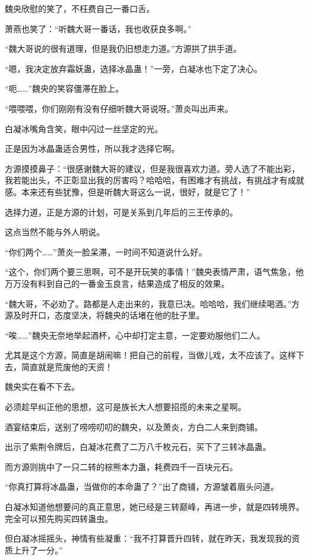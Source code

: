 \begin{this_body}
魏央欣慰的笑了，不枉费自己一番口舌。

萧燕也笑了：“听魏大哥一番话，我也收获良多啊。”

“魏大哥说的很有道理，但是我仍旧想走力道。”方源拱了拱手道。

“嗯，我决定放弃霜妖蛊，选择冰晶蛊！”一旁，白凝冰也下定了决心。

“呃……”魏央的笑容僵滞在脸上。

“喂喂喂，你们刚刚有没有仔细听魏大哥说呀。”萧炎叫出声来。

白凝冰嘴角含笑，眼中闪过一丝坚定的光。

正是因为冰晶蛊适合男性，所以我才选择它啊。

方源摸摸鼻子：“很感谢魏大哥的建议，但是我很喜欢力道。旁人选了不能出彩，我若能出头，不正彰显出我的厉害吗？哈哈哈，有困难才有挑战，有挑战才有成就感。本来还有些犹豫，但是听魏大哥这么一说，很好，就是它了！”

选择力道，正是方源的计划，可是关系到几年后的三王传承的。

这点当然不能与外人明说。

“你们两个……”萧炎一脸呆滞，一时间不知道说什么好。

“这个，你们两个要三思啊，可不是开玩笑的事情！”魏央表情严肃，语气焦急，他万万没有料到自己的一番金玉良言，结果造成了相反的效果。

“魏大哥，不必劝了。路都是人走出来的，我意已决。哈哈哈，我们继续喝酒。”方源及时开口，态度坚决，将魏央的话堵在他的肚子里。

“唉……”魏央无奈地举起酒杯，心中却打定主意，一定要劝服他们二人。

尤其是这个方源，简直是胡闹嘛！把自己的前程，当做儿戏，太不应该了。这样下去，简直就是荒废他的天资！

魏央实在看不下去。

必须趁早纠正他的思想，这可是族长大人想要招揽的未来之星啊。

酒宴结束后，送别了唠唠叨叨的魏央，以及萧炎，方白二人来到商铺。

出示了紫荆令牌后，白凝冰花费了二万八千枚元石，买下了三转冰晶蛊。

而方源则挑中了一只二转的棕熊本力蛊，耗费四千一百块元石。

“你真打算将冰晶蛊，当做你的本命蛊了？”出了商铺，方源皱着眉头问道。

白凝冰知道他想要问的真正意思，她已经是三转巅峰，再进一步，就是四转境界。完全可以预先购买四转蛊虫。

但白凝冰摇摇头，神情有些凝重：“我不打算晋升四转，就在昨天，我发现我的资质上升了一分。”


\end{this_body}
